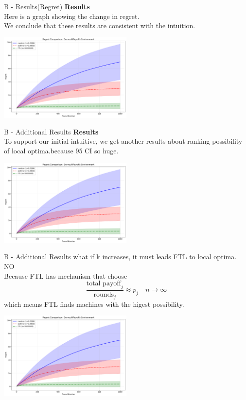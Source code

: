 \documentclass{beamer}
\begin{document}
\begin{frame}{B - Results(Regret)}
\textbf{Results}\\
Here is a graph showing the change in regret. \\
We conclude that these results are consistent with the intuition. \\
\begin{center}
    \includegraphics[width=0.5\textwidth]{332Project2/figures/bernoulli_regret_comparison.png}
\end{center}
\end{frame}

\begin{frame}{B - Additional Results}
\textbf{Results}\\
To support our initial intuitive, we get another results about ranking
possibility of local optima.because 95 CI so huge.
\begin{center}
    \includegraphics[width=0.5\textwidth]{332Project2/figures/bernoulli_regret_comparison.png}
\end{center}
\end{frame}

\begin{frame}{B - Additional Results}
what if k increases, it must leads FTL to local optima.  NO\\
Because FTL has mechanism that choose 
\[
\frac{\text{total payoff}_j}{\text{rounds}_j} \approx p_j \quad n \rightarrow\infty
\]
which means FTL finds machines with the higest possibility.
\begin{center}
    \includegraphics[width=0.5\textwidth]{332Project2/figures/bernoulli_regret_comparison.png}
\end{center}
\end{frame}
\end{document}
